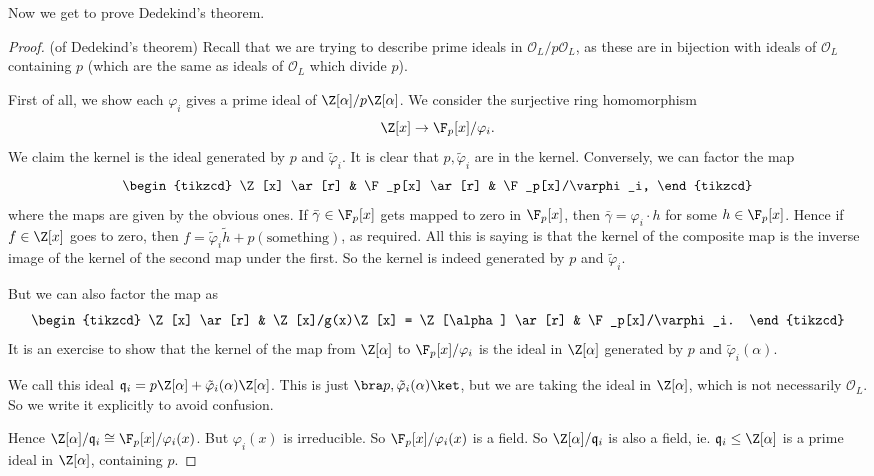 \documentclass[a4paper]{article}
\begin{document}
Now we get to prove Dedekind's theorem.

\begin{proof}(of Dedekind's theorem)
  Recall that we are trying to describe prime ideals in $\mathcal{O}_L/p\mathcal{O}_L$, as these are in bijection with ideals of $\mathcal{O}_L$ containing $p$ (which are the same as ideals of $\mathcal{O}_L$ which divide $p$).

  First of all, we show each $\varphi_i$ gives a prime ideal of $\Z[\alpha]/p\Z[\alpha]$. We consider the surjective ring homomorphism
  \[
    \Z[x] \to \F_p[x]/\varphi_i.
  \]
  We claim the kernel is the ideal generated by $p$ and $\tilde{\varphi}_i$. It is clear that $p, \tilde{\varphi}_i$ are in the kernel. Conversely, we can factor the map
  \[
    \begin{tikzcd}
      \Z[x] \ar[r] & \F_p[x] \ar[r] & \F_p[x]/\varphi_i,
    \end{tikzcd}
  \]
  where the maps are given by the obvious ones. If $\bar{\gamma} \in \F_p[x]$ gets mapped to zero in $\F_p[x]$, then $\bar{\gamma} = \varphi_i \cdot h$ for some $h \in \F_p[x]$. Hence if $f \in \Z[x]$ goes to zero, then $f = \tilde{\varphi}_i \tilde{h} + p(\text{something})$, as required. All this is saying is that the kernel of the composite map is the inverse image of the kernel of the second map under the first. So the kernel is indeed generated by $p$ and $\tilde{\varphi}_i$.

  But we can also factor the map as
  \[
    \begin{tikzcd}
      \Z[x] \ar[r] & \Z[x]/g(x)\Z[x] = \Z[\alpha] \ar[r] & \F_p[x]/\varphi_i.
    \end{tikzcd}
  \]
  It is an exercise to show that the kernel of the map from $\Z[\alpha]$ to $\F_p[x]/\varphi_i$ is the ideal in $\Z[\alpha]$ generated by $p$ and $\tilde{\varphi}_i(\alpha)$. %

  We call this ideal $\mathfrak{q}_i = p\Z[\alpha] + \tilde{\varphi}_i(\alpha) \Z[\alpha]$. This is just $\bra p, \tilde{\varphi}_i(\alpha)\ket$, but we are taking the ideal in $\Z[\alpha]$, which is not necessarily $\mathcal{O}_L$. So we write it explicitly to avoid confusion.

  Hence $\Z[\alpha]/\mathfrak{q}_i \cong \F_p[x]/\varphi_i(x)$. But $\varphi_i(x)$ is irreducible. So $\F_p[x]/\varphi_i(x)$ is a field. So $\Z[\alpha]/\mathfrak{q}_i$ is also a field, ie. $\mathfrak{q}_i \leq \Z[\alpha]$ is a prime ideal in $\Z[\alpha]$, containing $p$.


\end{proof}
\end{document}
